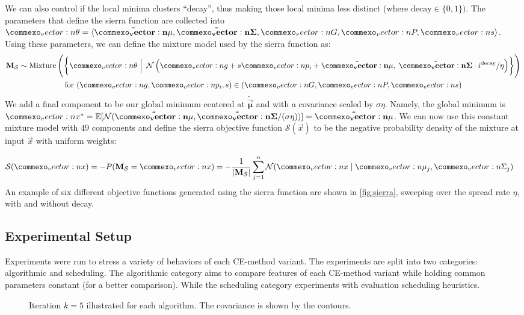 We can also control if the local minima clusters ``decay'', thus making those local minima less distinct (where $\text{decay} \in \{0, 1\})$.
The parameters that define the sierra function are collected into $\vec{\theta} = \langle \mathbf{\tilde{\vec{\mu}}}, \mathbf{\tilde{\mat{\Sigma}}}, \mat{G}, \mat{P}, \vec{s} \rangle$.
Using these parameters, we can define the mixture model used by the sierra function as:
\begin{gather*}
    \Sierra \sim \operatorname{Mixture}\left(\left\{ \vec{\theta} ~\Big|~ \Normal\left(\vec{g} +  s\vec{p}_i + \mathbf{\tilde{\vec{\mu}}},\; \mathbf{\tilde{\mat{\Sigma}}} \cdot i^{\text{decay}}/\eta \right) \right\} \right)\\
    \text{for } (\vec{g}, \vec{p}_i, s) \in (\mat{G}, \mat{P}, \vec{s})
\end{gather*}
We add a final component to be our global minimum centered at $\mathbf{\tilde{\vec{\mu}}}$ and with a covariance scaled by $\sigma\eta$. Namely, the global minimum is $\vec{x}^* = \E[\Normal(\mathbf{\tilde{\vec{\mu}}}, \mathbf{\tilde{\mat{\Sigma}}}/(\sigma\eta))] = \mathbf{\tilde{\vec{\mu}}}$.
We can now use this constant mixture model with $49$ components and define the sierra objective function $\mathcal{S}(\vec{x})$ to be the negative probability density of the mixture at input $\vec{x}$ with uniform weights:

\begin{align*}
    \mathcal{S}(\vec{x}) &= -P(\Sierra = \vec{x}) = -\frac{1}{|\Sierra|}\sum_{j=1}^{n}\Normal(\vec{x} \mid \vec{\mu}_j, \mat{\Sigma}_j)
\end{align*}
An example of six different objective functions generated using the sierra function are shown in \cref{fig:sierra}, sweeping over the spread rate $\eta$, with and without decay.

\subsection{Experimental Setup} \label{sec:experiment_setup}
Experiments were run to stress a variety of behaviors of each CE-method variant.
The experiments are split into two categories: algorithmic and scheduling.
The algorithmic category aims to compare features of each CE-method variant while holding common parameters constant (for a better comparison).
While the scheduling category experiments with evaluation scheduling heuristics.

\begin{figure*}[!t]
  \centering
  \caption{
    \label{fig:k5} Iteration $k=5$ illustrated for each algorithm. The covariance is shown by the contours.
  } 
\end{figure*}

